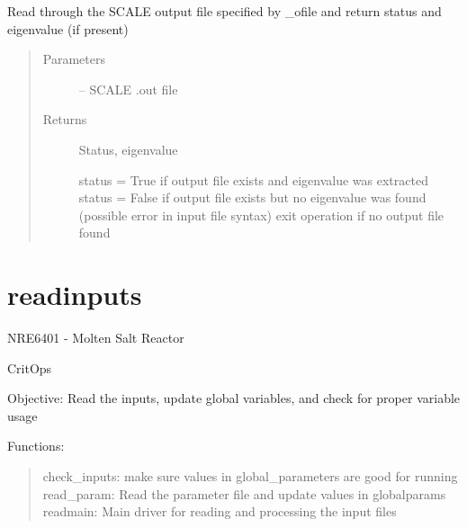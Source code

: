\documentclass[letterpaper,10pt,english]{sphinxmanual}
\begin{document}
\begin{fulllineitems}
\label{\detokenize{iterator:critops.iterator.parse_scale_out_eig}}
Read through the SCALE output file specified by \_ofile and return status and eigenvalue (if present)
\begin{quote}\begin{description}
\item[{Parameters}] \leavevmode
{} -- SCALE .out file

\item[{Returns}] \leavevmode

Status, eigenvalue

status = True if output file exists and eigenvalue was extracted
status = False if output file exists but no eigenvalue was found (possible error in input file syntax)
exit operation if no output file found


\end{description}\end{quote}

\end{fulllineitems}



\chapter{readinputs}
\label{\detokenize{readinputs:readinputs}}\label{\detokenize{readinputs:module-critops.readinputs}}\label{\detokenize{readinputs::doc}}
NRE6401 - Molten Salt Reactor

CritOps

Objective: Read the inputs, update global variables, and check for proper variable usage

Functions:
\begin{quote}

check\_inputs: make sure values in global\_parameters are good for running
read\_param: Read the parameter file and update values in globalparams
readmain: Main driver for reading and processing the input files
\end{quote}
\end{document}
